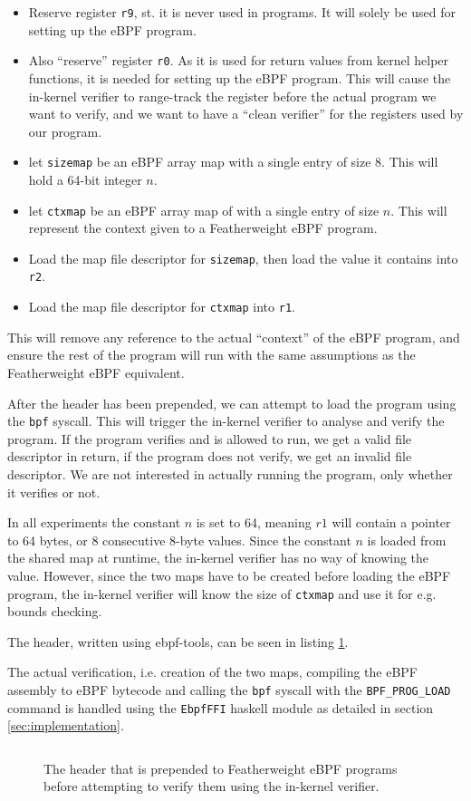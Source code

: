 \begin{itemize}
\item Reserve register \texttt{r9}, st. it is never used in programs. It will solely be used for setting up the eBPF program.
  \item Also ``reserve'' register \texttt{r0}. As it is used for return values from kernel helper functions, it is needed for setting up the eBPF program. This will cause the in-kernel verifier to range-track the register before the actual program we want to verify, and we want to have a ``clean verifier'' for the registers used by our program.
\item let \texttt{sizemap} be an eBPF array map with a single entry of size 8. This will hold a 64-bit integer $n$.
\item let \texttt{ctxmap} be an eBPF array map of with a single entry of size $n$. This will represent the context given to a Featherweight eBPF program.
\item Load the map file descriptor for \texttt{sizemap}, then load the value it contains into \texttt{r2}.
  \item Load the map file descriptor for \texttt{ctxmap} into \texttt{r1}. 
  \end{itemize}
  This will remove any reference to the actual ``context'' of the eBPF program, and ensure the rest of the program will run with the same assumptions as the Featherweight eBPF equivalent.

  
  After the header has been prepended, we can attempt to load the program using the \texttt{bpf} syscall. This will trigger the in-kernel verifier to analyse and verify the program. If the program verifies and is allowed to run, we get a valid file descriptor in return, if the program does not verify, we get an invalid file descriptor.
  We are not interested in actually running the program, only whether it verifies or not.

In all experiments the constant $n$ is set to 64, meaning $r1$ will contain a pointer to 64 bytes, or 8 consecutive 8-byte values. Since the constant $n$ is loaded from the shared map at runtime, the in-kernel verifier has no way of knowing the value. However, since the two maps have to be created before loading the eBPF program, the in-kernel verifier will know the size of \texttt{ctxmap} and use it for e.g. bounds checking. 
  
  The header, written using ebpf-tools, can be seen in listing \ref{snip:compare-header}.

The actual verification, i.e. creation of the two maps, compiling the eBPF assembly to eBPF bytecode and calling the \texttt{bpf} syscall with the \texttt{BPF\_PROG\_LOAD} command is handled using the \texttt{EbpfFFI} haskell module as detailed in section \ref{sec:implementation}.
  
  \begin{figure}[!htb]
    \centering
\inputminted[linenos]{haskell}{snippets/compare-header.hs}
    \caption{The header that is prepended to Featherweight eBPF programs before attempting to verify them using the in-kernel verifier.}
    \label{snip:compare-header}
  \end{figure}



